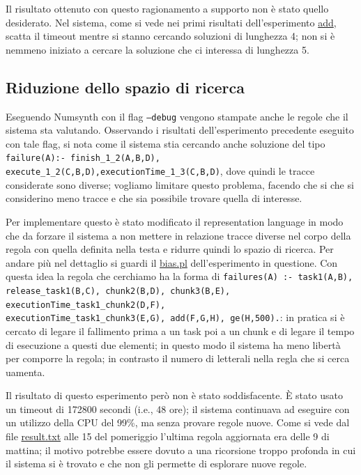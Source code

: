 Il risultato ottenuto con questo ragionamento a supporto non è stato quello desiderato. Nel sistema, come si vede nei primi risultati dell'esperimento \href{https://github.com/edoardosarri24/prediction-in-data-driven-system/blob/main/my-experiments/12-add/result.txt}{add}, scatta il timeout mentre si stanno cercando soluzioni di lunghezza 4; non si è nemmeno iniziato a cercare la soluzione che ci interessa di lunghezza 5.

\subsection{Riduzione dello spazio di ricerca}
Eseguendo Numsynth con il flag \texttt{--debug} vengono stampate anche le regole che il sistema sta valutando. Osservando i risultati dell'esperimento precedente eseguito con tale flag, si nota come il sistema stia cercando anche soluzione del tipo \texttt{failure(A):- finish\_1\_2(A,B,D), execute\_1\_2(C,B,D),executionTime\_1\_3(C,B,D)}, dove quindi le tracce considerate sono diverse; vogliamo limitare questo problema, facendo che si che si considerino meno tracce e che sia possibile trovare quella di interesse.

Per implementare questo è stato modificato il representation language in modo che da forzare il sistema a non mettere in relazione tracce diverse nel corpo della regola con quella definita nella testa e ridurre quindi lo spazio di ricerca. Per andare più nel dettaglio si guardi il \href{https://github.com/edoardosarri24/prediction-in-data-driven-system/blob/main/my-experiments/13-add-in/bias.pl}{bias.pl} dell'esperimento in questione. Con questa idea la regola che cerchiamo ha la forma di \texttt{failures(A) :- task1(A,B), release\_task1(B,C), chunk2(B,D), chunk3(B,E), executionTime\_task1\_chunk2(D,F), \\ executionTime\_task1\_chunk3(E,G), add(F,G,H), ge(H,500).}: in pratica si è cercato di legare il fallimento prima a un task poi a un chunk e di legare il tempo di esecuzione a questi due elementi; in questo modo il sistema ha meno libertà per comporre la regola; in contrasto il numero di letterali nella regla che si cerca uamenta.

Il risultato di questo esperimento però non è stato soddisfacente. È stato usato un timeout di 172800 secondi (i.e., 48 ore); il sistema continuava ad eseguire con un utilizzo della CPU del 99\%, ma senza provare regole nuove. Come si vede dal file \href{https://github.com/edoardosarri24/prediction-in-data-driven-system/blob/main/my-experiments/13-add-in/result.txt}{result.txt} alle 15 del pomeriggio l'ultima regola aggiornata era delle 9 di mattina; il motivo potrebbe essere dovuto a una ricorsione troppo profonda in cui il sistema si è trovato e che non gli permette di esplorare nuove regole.